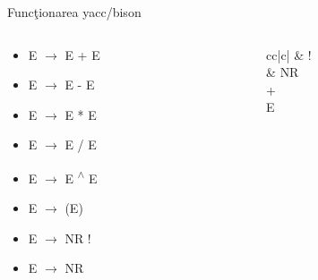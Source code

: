 \documentclass[pdf]{beamer}
\begin{document}
\begin{frame}{Funcţionarea yacc/bison}
\begin{columns}
\begin{column}{0.5\textwidth}
\begin{itemize}
	\item
	E $\rightarrow$ E + E

	\item
	E $\rightarrow$ E - E

	\item
	E $\rightarrow$ E * E

	\item
	E $\rightarrow$ E / E

	\item
	E $\rightarrow$ E \textsuperscript{$\wedge$} E

	\item
	E $\rightarrow$ (E)

	\item
	E $\rightarrow$ NR !

	\item
	E $\rightarrow$ NR

\end{itemize}
\end{column}

\begin{column}{0.3\textwidth}
\begin{tabular}{cc|c|} 
 & {\hspace{0.4cm} !} \\ 
 &   
 {NR} \\
 {+} \\
 {E} \\ 
\end{tabular}

\end{column}
\end{columns}
\end{frame}
\end{document}
